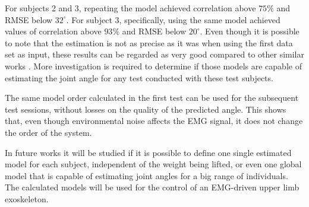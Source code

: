 \documentclass[letterpaper, 10 pt, conference]{ieeeconf}  %
\begin{document}
For subjects 2 and 3, repeating the model achieved correlation above $75\%$ and RMSE below $32^\circ$. For subject 3, specifically, using the same model achieved values of correlation above $93\%$ and RMSE below $20^\circ$. Even though it is possible to note that the estimation is not as precise as it was when using the first data set as input, these results can be regarded as very good compared to other similar works \cite{Pang2015165,Rahmatian2016158,Mamikoglu2016785,Liu1999391}. More investigation is required to determine if those models are capable of estimating the joint angle for any test conducted with these test subjects.
% 
% 

% 
% 

The same model order calculated in the first test can be used for the subsequent test sessions, without losses on the quality of the predicted angle. This shows that, even though environmental noise affects the EMG signal, it does not change the order of the system.

In future works it will be studied if it is possible to define one single estimated model for each subject, independent of the weight being lifted, or even one global model that is capable of estimating joint angles for a big range of individuals. The calculated models will be used for the control of an EMG-driven upper limb exoskeleton.

















\end{document}
